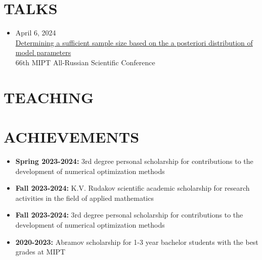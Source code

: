 \documentclass[11pt,a4paper]{moderncv}
\begin{document}
\section{TALKS}
\begin{itemize}
    \item April 6, 2024\\
    \href{https://www.youtube.com/live/WnIRaRl730A?si=q0eScgnDP2ZidCpK&t=1723}{Determining a sufficient sample size based on the a posteriori distribution of model parameters}\\
    66th MIPT All-Russian Scientific Conference
\end{itemize}

\section{TEACHING}

\section{ACHIEVEMENTS}
\begin{itemize}
    \item \textbf{Spring 2023-2024:} 3rd degree personal scholarship for contributions to the development of numerical optimization methods
    \item \textbf{Fall 2023-2024:} K.V. Rudakov scientific academic scholarship for research activities in the field of applied mathematics
    \item \textbf{Fall 2023-2024:} 3rd degree personal scholarship for contributions to the development of numerical optimization methods
    \item \textbf{2020-2023:} Abramov scholarship for 1-3 year bachelor students with the best grades at MIPT
\end{itemize}
\end{document}

